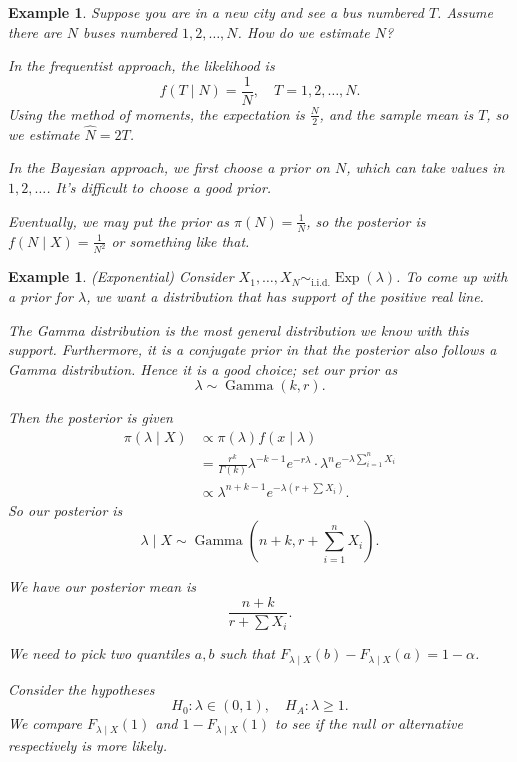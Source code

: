 \documentclass{tufte-handout}
\newtheorem{ex}[thm]{Example}
\theoremstyle{definition}
\begin{document}
\begin{ex}
	Suppose you are in a new city and see a bus numbered $T$. Assume there are $N$ buses numbered $1,2,\ldots,N$. How do we estimate $N$?

	In the frequentist approach, the likelihood is \[
		f(T \mid N ) = \frac{1}{N}, \quad T = 1,2,\ldots,N
	.\] Using the method of moments, the expectation is $\frac{N}{2}$, and the sample mean is $T$, so we estimate $\hat{N} = 2T$.

	In the Bayesian approach, we first choose a prior on $N$, which can take values in $1,2,\ldots$. It's difficult to choose a good prior.

	Eventually, we may put the prior as $\pi(N) = \frac{1}{N}$, so the posterior is $f(N \mid X) = \frac{1}{N^2}$ or something like that.
\end{ex}

\begin{ex}
	(Exponential) Consider $X_1,\ldots,X_N \sim_{\text{i.i.d.}} \operatorname{Exp}(\lambda)$. To come up with a prior for $\lambda$, we want a distribution that has support of the positive real line.

	The Gamma distribution is the most general distribution we know with this support. Furthermore, it is a conjugate prior in that the posterior also follows a Gamma distribution. Hence it is a good choice; set our prior as \[
		\lambda \sim  \operatorname{Gamma}(k, r)
	.\] 

	Then the posterior is given \begin{align*}
		\pi(\lambda \mid X) &\propto \pi(\lambda) f(x \mid \lambda)\\
							&= \frac{r^k}{\Gamma(k)} \lambda^{-k-1}e^{-r\lambda} \cdot \lambda^{n } e^{-\lambda \sum\limits_{i=1}^{n} X_i} \\
							&\propto \lambda^{n+k-1} e^{-\lambda \left( r + \sum\limits X_i \right)}
	.\end{align*}
	So our posterior is \[
		\lambda \mid X \sim \operatorname{Gamma}\left( n+k, r + \sum\limits_{i=1}^{n} X_i \right)
	.\] 

	 We have our posterior mean is \[
		\frac{n+k}{r + \sum X_i}
	.\]

	 We need to pick two quantiles $a,b$ such that $F_{\lambda \mid X}(b) - F_{\lambda \mid X}(a) = 1-\alpha$.

	 Consider the hypotheses \[
		H_0: \lambda \in (0,1), \quad H_A: \lambda \ge 1
	.\] We compare $F_{\lambda\mid X}(1)$ and $1 - F_{\lambda\mid X}(1)$ to see if the null or alternative respectively is more likely.
\end{ex}
\end{document}
